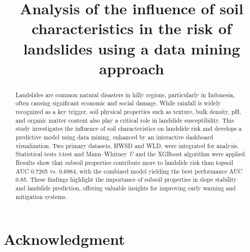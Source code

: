 \documentclass[conference]{IEEEtran}
\begin{document}
\title{Analysis of the influence of soil characteristics in the risk of landslides using a data mining approach\\}

\author{
}


\maketitle

\begin{abstract}
Landslides are common natural disasters in hilly regions, particularly in Indonesia, often causing significant economic and social damage. While rainfall is widely recognized as a key trigger, soil physical properties such as texture, bulk density, pH, and organic matter content also play a critical role in landslide susceptibility. This study investigates the influence of soil characteristics on landslide risk and develops a predictive model using data mining, enhanced by an interactive dashboard visualization. Two primary datasets, HWSD and WLD, were integrated for analysis. Statistical tests \textit{t}-test and Mann–Whitney \textit{U} and the XGBoost algorithm were applied. Results show that subsoil properties contribute more to landslide risk than topsoil AUC 0.7205 vs. 0.6984, with the combined model yielding the best performance AUC 0.85. These findings highlight the importance of subsoil properties in slope stability and landslide prediction, offering valuable insights for improving early warning and mitigation systems.
\end{abstract}








\section*{Acknowledgment}
\end{document}
